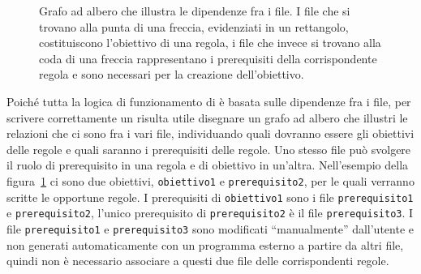 \begin{figure}
  \centering
  \caption{Grafo ad albero che illustra le dipendenze fra i file.  I file che si
    trovano alla punta di una freccia, evidenziati in un rettangolo,
    costituiscono l'obiettivo di una regola, i file che invece si trovano alla
    coda di una freccia rappresentano i prerequisiti della corrispondente
    regola e sono necessari per la creazione dell'obiettivo.}
  \label{fig:grafo-albero1}
\end{figure}
Poiché tutta la logica di funzionamento di  è basata sulle
dipendenze fra i file, per scrivere correttamente un 
risulta utile disegnare un grafo ad albero che illustri le relazioni che ci sono
fra i vari file, individuando quali dovranno essere gli obiettivi delle regole e
quali saranno i prerequisiti delle regole.  Uno stesso file può svolgere il
ruolo di prerequisito in una regola e di obiettivo in un'altra.  Nell'esempio
della figura~\ref{fig:grafo-albero1} ci sono due obiettivi, \texttt{obiettivo1}
e \texttt{prerequisito2}, per le quali verranno scritte le opportune regole.  I
prerequisiti di \texttt{obiettivo1} sono i file \texttt{prerequisito1} e
\texttt{prerequisito2}, l'unico prerequisito di \texttt{prerequisito2} è il file
\texttt{prerequisito3}.  I file \texttt{prerequisito1} e \texttt{prerequisito3}
sono modificati ``manualmente'' dall'utente e non generati automaticamente con
un programma esterno a partire da altri file, quindi non è necessario associare
a questi due file delle corrispondenti regole.

